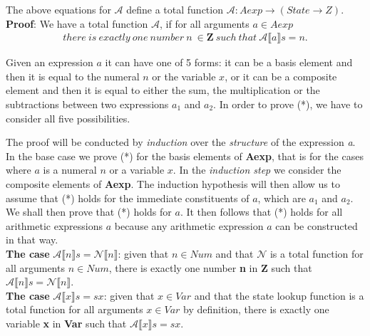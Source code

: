 \documentclass{article}
\begin{document}

The above equations for $\mathcal{A}$ define a total function $\mathcal{A}: Aexp \rightarrow (State \rightarrow Z)$. \\

\noindent \textbf{Proof}: We have a total function $\mathcal A$, if for all arguments $a \in Aexp$
\begin{equation}
\tag{*}
\begin{split}
there\ is\ exactly\ one\ number\ n\ \in \textbf{Z}\ such\ that\ \mathcal{A} \llbracket a \rrbracket s = n.
\end{split}
\end{equation}

\noindent Given an expression $a$ it can have one of 5 forms: it can be a basis element and then it is equal to the numeral $n$ or the variable $x$, or it can be a composite element and then it is equal to either the sum, the multiplication or the subtractions between two expressions $a_1$ and $a_2$. In order to prove (*), we have to consider all five possibilities.

The proof will be conducted by \textit{induction} over the \textit{structure} of the expression \textit{a}. In the base case we prove (*) for the basis elements of \textbf{Aexp},
that is for the cases where $a$ is a numeral $n$ or a variable $x$. In the \textit{induction step} we consider the composite elements of \textbf{Aexp}.
The induction hypothesis will then allow us to assume that (*) holds for the immediate constituents of $a$, which are $a_1$ and $a_2$. We shall then prove that (*) holds for $a$.
It then follows that (*) holds for all arithmetic expressions $a$ because any arithmetic expression $a$ can be constructed in that way. \\

\noindent \textbf{The case} $\mathcal{A}\llbracket n \rrbracket s = \mathcal{N} \llbracket n \rrbracket$: given that $n \in Num$ and that $\mathcal{N}$ is a total function for all arguments $n \in Num$, there is exactly one number \textbf{n} in \textbf{Z}
such that $\mathcal{A}\llbracket n \rrbracket s = \mathcal{N} \llbracket n \rrbracket$. \\

\noindent \textbf{The case} $\mathcal{A}\llbracket x \rrbracket s = s x$: given that $x \in Var$ and that the state lookup function is a total function for all arguments $x \in Var$ by definition, there is exactly one variable \textbf{x} in \textbf{Var}
such that $\mathcal{A}\llbracket x \rrbracket s = s x$. \\
\end{document}
